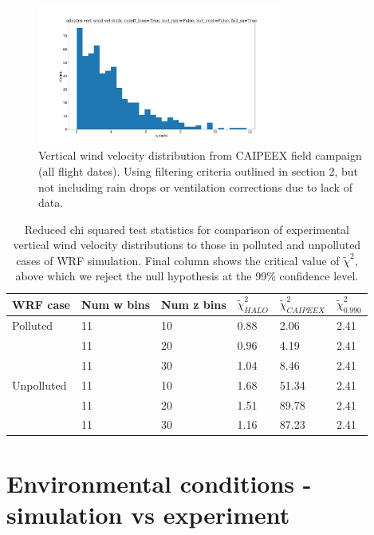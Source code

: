 \documentclass{article}
\begin{document}
\begin{figure}[ht]
    \centering
    \includegraphics[width=8cm]{revcaipeex/v10_w_hist_alldates_figure.png}
    \caption{Vertical wind velocity distribution from CAIPEEX field campaign (all flight dates). Using filtering criteria outlined in section 2, but not including rain drops or ventilation corrections due to lack of data.}
    \label{caipeexwhist}
\end{figure}
\begin{table}[ht]
\centering
\begin{tabular}{@{}llllll@{}}
\toprule
\textbf{WRF case} & \textbf{Num w bins} & \textbf{Num z bins} & \textbf{$\tilde\chi^2_{HALO}$} & \textbf{$\tilde\chi^2_{CAIPEEX}$} & \textbf{$\tilde\chi^2_{0.990}$} \\ \midrule
Polluted & 11 & 10 & 0.88 & 2.06 & 2.41 \\
 & 11 & 20 & 0.96 & 4.19 & 2.41 \\
 & 11 & 30 & 1.04 & 8.46 & 2.41 \\
Unpolluted & 11 & 10 & 1.68 & 51.34 & 2.41 \\
 & 11 & 20 & 1.51 & 89.78 & 2.41 \\
 & 11 & 30 & 1.16 & 87.23 & 2.41 \\ \bottomrule
\end{tabular}
\caption{Reduced chi squared test statistics for comparison of experimental vertical wind velocity distributions to those in polluted and unpolluted cases of WRF simulation. Final column shows the critical value of $\tilde\chi^2$, above which we reject the null hypothesis at the 99\% confidence level.}
\label{chisqw}
\end{table}

\clearpage
\newpage

\section{Environmental conditions - simulation vs experiment}
\end{document}
